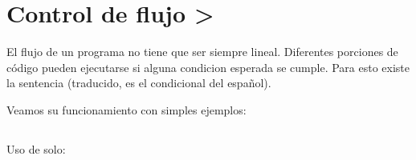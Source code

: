\documentclass[a5paper,9pt,spanish]{sphinxmanual}
\begin{document}
\begin{sphinxVerbatim}[commandchars=\\\{\}]
  
  

  

  

  
\end{sphinxVerbatim}


\section{Control de flujo \sphinxhyphen{}\textgreater{} }
\label{\detokenize{bool:control-de-flujo-if-elif-else}}
\sphinxAtStartPar
El flujo de un programa no tiene que ser siempre lineal.
Diferentes porciones de código pueden ejecutarse si alguna condicion esperada se cumple.
Para esto existe la sentencia  (traducido, es el  condicional del español).

\sphinxAtStartPar
Veamos su funcionamiento con simples ejemplos:


\subsection{}
\label{\detokenize{bool:if}}
\sphinxAtStartPar
Uso de  solo:

\begin{sphinxVerbatim}[commandchars=\\\{\}]
  
     
\end{sphinxVerbatim}
\end{document}
